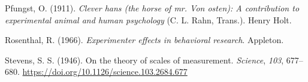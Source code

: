 \documentclass[
  a4paper,
]{book}
\newlength{\cslhangindent}
\newenvironment{CSLReferences}[2] %
 {\begin{list}{}{%
  \setlength{\itemindent}{0pt}
  \setlength{\leftmargin}{0pt}
  \setlength{\parsep}{0pt}
  \ifodd #1
   \setlength{\leftmargin}{\cslhangindent}
   \setlength{\itemindent}{-1\cslhangindent}
  \fi
  \setlength{\itemsep}{#2\baselineskip}}}
 {\end{list}}
\begin{document}
\begin{CSLReferences}{1}{0}
Pfungst, O. (1911). \emph{Clever hans (the horse of mr. Von osten): A
contribution to experimental animal and human psychology} (C. L. Rahn,
Trans.). Henry Holt.

Rosenthal, R. (1966). \emph{Experimenter effects in behavioral
research}. Appleton.

Stevens, S. S. (1946). On the theory of scales of measurement.
\emph{Science}, \emph{103}, 677--680.
\url{https://doi.org/10.1126/science.103.2684.677}

\end{CSLReferences}


\backmatter
\end{document}
